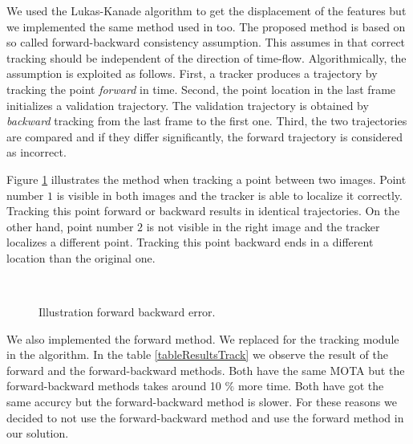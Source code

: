 We used the Lukas-Kanade algorithm to get the displacement of the features but we implemented the same method used in \cite{medianFlow} too. The proposed method is based on so called forward-backward consistency assumption. This assumes in that correct tracking should be independent of the direction of time-flow.
Algorithmically, the assumption is exploited as follows. First, a tracker produces a trajectory by tracking the point \textit{forward} in time. Second, the point location in the last frame initializes a validation trajectory. The validation trajectory is obtained by \textit{backward} tracking from the last frame to the first one. Third, the two trajectories are compared and if they differ significantly, the forward trajectory is considered as incorrect. 

Figure \ref{experiTrack5} illustrates the method when tracking a point between two images. Point number $1$  is visible in both images and the tracker is able to localize it correctly. Tracking this point forward or backward results in identical trajectories. On the other hand, point number $2$ is not visible in the right image and the tracker localizes a different point. Tracking this point backward ends in a different location than the original one.

\begin{figure}[H]
		
\centering

\\
\caption{Illustration forward backward error.}
\label{experiTrack5}
\end{figure}


We also implemented the forward method. We replaced for the tracking module in the algorithm. In the table \ref{tableResultsTrack} we observe the result of the forward and the forward-backward methods. Both have the same MOTA but the forward-backward methods takes around 10 $\%$ more time. Both have got the same accurcy but the forward-backward method is slower. For these reasons we decided to not use the forward-backward method and use the forward method in our solution.

